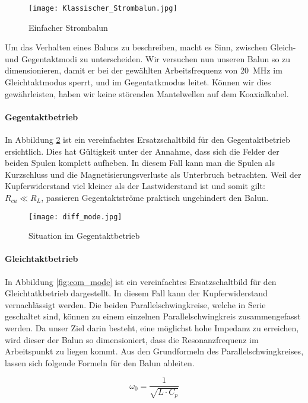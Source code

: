 \begin{figure}[H]
	\centering
	\texttt{[image: Klassischer\_Strombalun.jpg]}
	\caption{Einfacher Strombalun}\label{fig:klassischer_strombalun}
\end{figure}



\newpage

Um das Verhalten eines Baluns zu beschreiben, macht es Sinn, zwischen Gleich- und Gegentaktmodi zu unterscheiden. Wir versuchen nun unseren Balun so zu dimensionieren, damit er bei der gewählten Arbeitsfrequenz von \SI{20}{MHz} im Gleichtaktmodus sperrt, und im Gegentatkmodus leitet. Können wir dies gewährleisten, haben wir keine störenden Mantelwellen auf dem Koaxialkabel.

\paragraph{Gegentaktbetrieb}
In Abbildung \ref{fig:diff_mode} ist ein vereinfachtes Ersatzschaltbild für den Gegentaktbetrieb ersichtlich. Dies hat Gültigkeit unter der Annahme, dass sich die Felder der beiden Spulen komplett aufheben. In diesem Fall kann man die Spulen als Kurzschluss und die Magnetisierungsverluste als Unterbruch betrachten. 
Weil der Kupferwiderstand viel kleiner als der Lastwiderstand ist und somit gilt:  $R_{cu} \ll R_{L}$, passieren Gegentaktströme praktisch ungehindert den Balun.
\begin{figure}[H]
	\centering
	\texttt{[image: diff\_mode.jpg]}
	\caption{Situation im Gegentaktbetrieb}\label{fig:diff_mode}
\end{figure}

\paragraph{Gleichtaktbetrieb}
In Abbildung \ref{fig:com_mode} ist ein vereinfachtes Ersatzschaltbild für den Gleichtatkbetrieb dargestellt. In diesem Fall kann der Kupferwiderstand vernachlässigt werden. Die beiden Parallelschwingkreise, welche in Serie geschaltet sind, können zu einem einzelnen Parallelschwingkreis zusammengefasst werden. Da unser Ziel darin besteht, eine möglichst hohe Impedanz zu erreichen, wird dieser der Balun so dimensioniert, dass die Resonanzfrequenz im Arbeitspunkt zu liegen kommt. Aus den Grundformeln des Parallelschwingkreises, lassen sich folgende Formeln für den Balun ableiten. \cite{balun_schneider}

\begin{equation}
\omega_{0} = \frac{1}{\sqrt{L \cdot C_{p}}}
\label{equ:Resonanzfrequenz}
\end{equation}

